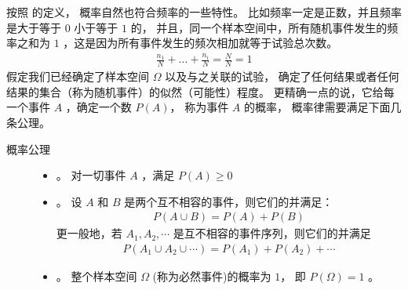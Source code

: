 \documentclass[letterpaper,10pt,english]{sphinxmanual}
\begin{document}
按照  的定义，
概率自然也符合频率的一些特性。
比如频率一定是正数，并且频率是大于等于 \(0\) 小于等于 \(1\) 的，
并且，同一个样本空间中，所有随机事件发生的频率之和为 \(1\)
，这是因为所有事件发生的频次相加就等于试验总次数。
\begin{equation}\label{equation:概率基础/content:概率基础/content:0}
\begin{split}\frac{n_1}{N} + \dots + \frac{n_i}{N} = \frac{N}{N} = 1\end{split}
\end{equation}
假定我们已经确定了样本空间 \(\Omega\) 以及与之关联的试验，
 确定了任何结果或者任何结果的集合（称为随机事件）的似然（可能性）程度。
更精确一点的说，它给每一个事件 \(A\) ，确定一个数 \(P(A)\)，
称为事件 \(A\) 的概率，
概率律需要满足下面几条公理。
\begin{description}
\item[{概率公理\label{\detokenize{_u6982_u7387_u57fa_u7840/content:term-0}}}] \leavevmode\begin{itemize}
\item {} 
。 对一切事件 \(A\) ，满足 \(P(A) \ge 0\)

\item {} 
。 设 \(A\) 和 \(B\) 是两个互不相容的事件，则它们的并满足：
\begin{equation}\label{equation:概率基础/content:概率基础/content:1}
\begin{split}P(A \cup B) = P(A) + P(B)\end{split}
\end{equation}
更一般地，若 \(A_1,A_2,\cdots\) 是互不相容的事件序列，则它们的并满足
\begin{equation}\label{equation:概率基础/content:概率基础/content:2}
\begin{split}P(A_1 \cup A_2 \cup \cdots) = P(A_1) + P(A_2) + \cdots\end{split}
\end{equation}
\item {} 
。 整个样本空间 \(\Omega\) (称为必然事件)的概率为 \(1\)，
即 \(P(\Omega) = 1\) 。

\end{itemize}

\end{description}
\end{document}
